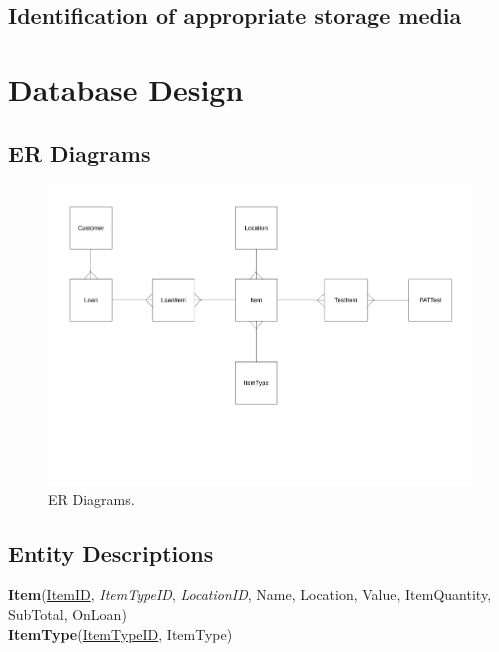 \subsection{Identification of appropriate storage media}

\section{Database Design}

\newpage

\begin{landscape}

\subsection{ER Diagrams}

\begin{figure}[H]
    \centerline{\includegraphics[width=600px]{./Design/ER_Diagrams/ER_Diagram.pdf}}
    \caption{ER Diagrams.} \label{fig:ER Diagrams}
\end{figure}

\end{landscape}

\subsection{Entity Descriptions}

\noindent \textbf{Item}(\underline{ItemID}, \emph{ItemTypeID}, \emph{LocationID}, Name, Location, Value, ItemQuantity, SubTotal, OnLoan)\\

\noindent \textbf{ItemType}(\underline{ItemTypeID}, ItemType)\\

